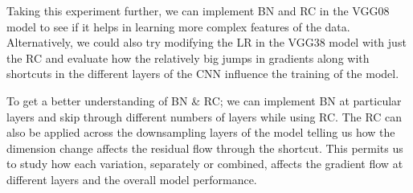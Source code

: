 {{Taking this experiment further, we can implement BN and RC in the VGG08 model to see if it helps in learning more complex features of the data. Alternatively, we could also try modifying the LR in the VGG38 model with just the RC and evaluate how the relatively big jumps in gradients along with shortcuts in the different layers of the CNN influence the training of the model. \par

To get a better understanding of BN \& RC; we can implement BN at particular layers and skip through different numbers of layers while using RC. The RC can also be applied across the downsampling layers of the model telling us how the dimension change affects the residual flow through the shortcut. This permits us to study how each variation, separately or combined, affects the 
gradient flow at different layers and the overall model performance.}
}


